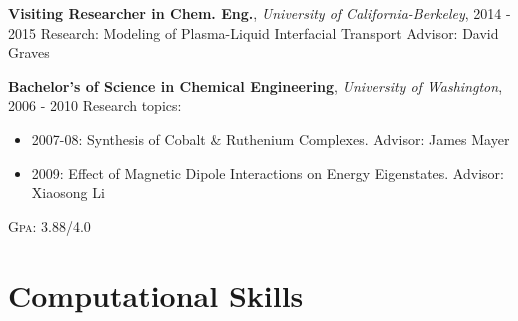 \documentclass[a4paper,10pt]{article} %
\begin{document}

\textbf{Visiting Researcher in Chem. Eng.}, \textit{University of California-Berkeley}, \textsc{2014 - 2015}\newline
\hspace*{0.5em}Research: Modeling of Plasma-Liquid Interfacial Transport\newline
\hspace*{0.5em}Advisor: David Graves\newline


\textbf{Bachelor's of Science in Chemical Engineering}, \textit{University of Washington}, \textsc{2006 - 2010}\newline
\hspace*{0.5em}Research topics:
\begin{itemize}[noitemsep, topsep=-\parskip, after={}]
\item 2007-08: Synthesis of Cobalt \& Ruthenium Complexes. \newline Advisor: James Mayer
\item 2009: Effect of Magnetic Dipole Interactions on Energy Eigenstates. \newline Advisor: Xiaosong Li
\end{itemize}
\hspace*{0.5em}\textsc{Gpa}: 3.88/4.0\newline



\section{Computational Skills}
\end{document}
